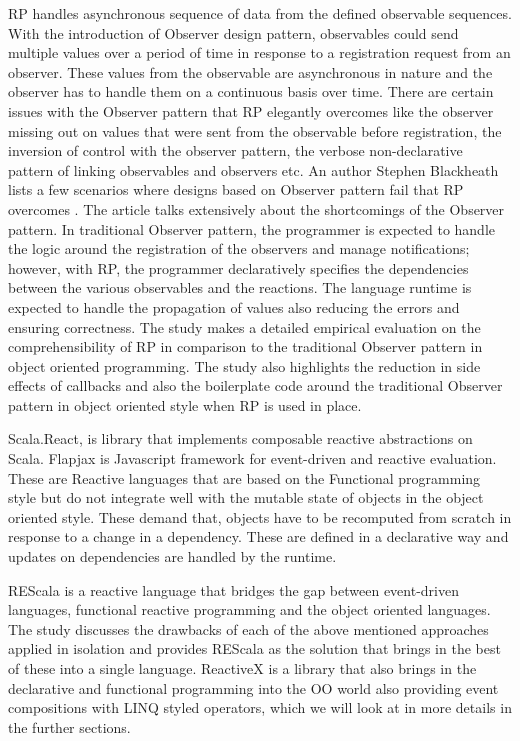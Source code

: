 RP handles asynchronous sequence of  data from the defined observable sequences. 
With the introduction of Observer design pattern, observables could send multiple values over a period of time in response to a registration request from an observer. 
These values from the observable are asynchronous in nature and the observer has to handle them on a continuous basis over time. 
There are certain issues with the Observer pattern that RP elegantly overcomes like the observer missing out on values that were sent from the observable before registration, the inversion of control with the observer pattern, the verbose non-declarative pattern of linking observables and observers etc. 
An author Stephen Blackheath lists a few scenarios where designs based on Observer pattern fail that RP overcomes \cite{whyFRP}. 
The article\cite{deprecatingTheObserverPattern} talks extensively about the shortcomings of the Observer pattern. 
In traditional Observer pattern, the programmer is expected to handle the logic around the registration of the observers and manage notifications; however, with RP, the programmer declaratively specifies the dependencies between the various observables and the reactions. 
The language runtime is expected to handle the propagation of values also reducing the errors and ensuring correctness. 
The study\cite{Salvaneschi:2014:ESP:2635868.2635895} makes a detailed empirical evaluation on the comprehensibility of RP in comparison to the traditional Observer pattern in object oriented programming. 
The study also highlights the reduction in side effects of callbacks and also the boilerplate code around the traditional Observer pattern in object oriented style when RP is used in place.

Scala.React\cite{deprecatingTheObserverPattern}, is library that implements composable reactive abstractions on Scala. Flapjax\cite{Meyerovich:2009:FPL:1639949.1640091} is Javascript framework for event-driven and reactive evaluation. These are Reactive languages that are based on the Functional programming style but do not integrate well with the mutable state of objects in the object oriented style. These demand that, objects have to be recomputed from scratch in response to a change in a dependency. These are defined in a declarative way and updates on dependencies are handled by the runtime.

REScala\cite{Salvaneschi:2014:RBO:2577080.2577083} is a reactive language that bridges the gap between event-driven languages, functional reactive programming and the object oriented languages. The study\cite{Salvaneschi:2014:RBO:2577080.2577083} discusses the drawbacks of each of the above mentioned approaches applied in isolation and provides REScala as the solution that brings in the best of these into a single language. ReactiveX\cite{reactiveX} is a library that also brings in the declarative and functional programming into the OO world also providing event compositions with LINQ\cite{linq} styled operators, which we will look at in more details in the further sections.

